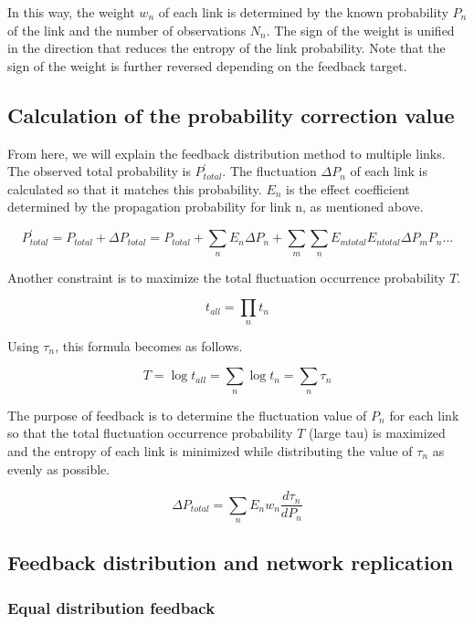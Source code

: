 \documentclass[12pt]{article}
\begin{document}
In this way, the weight $w_n$ of each link is determined by the known probability $P_n$ of the link and the number of observations $N_n$. 
The sign of the weight is unified in the direction that reduces the entropy of the link probability. 
Note that the sign of the weight is further reversed depending on the feedback target.

\subsection{Calculation of the probability correction value}\label{calculation-of-the-probability-correction-value-delta-p_n}

From here, we will explain the feedback distribution method to multiple
links. The observed total probability is \(P^{'}_{total}\). The
fluctuation \(\Delta P_n\) of each link is calculated so that it matches
this probability. \(E_n\) is the effect coefficient determined by the
propagation probability for link n, as mentioned above.

\[ P^{'}_{total}=P_{total}+ \Delta P_{total} = P_{total}+\sum_n E_n \Delta P_n + \sum _m \sum _n E_{m total}E_{n total}\Delta P_m P_n ...\]

Another constraint is to maximize the total fluctuation occurrence
probability \(T\).

\[ t_{all}=\prod_n t_n\]

Using \(\tau_n\), this formula becomes as follows.

\[T=\log t_{all} = \sum_n \log t_n = \sum_n \tau_n\]

The purpose of feedback is to determine the fluctuation value of \(P_n\)
for each link so that the total fluctuation occurrence probability \(T\)
(large tau) is maximized and the entropy of each link is minimized while
distributing the value of \(\tau_n\) as evenly as possible.

\[ \Delta P_{total}=\sum_{n} E_n w_n \frac{d \tau_n}{d P_n} \] 

\subsection{Feedback distribution and network replication}\label{feedback-distribution-and-network-replication}

\subsubsection{Equal distribution feedback}\label{equal-distribution-feedback}
\end{document}
